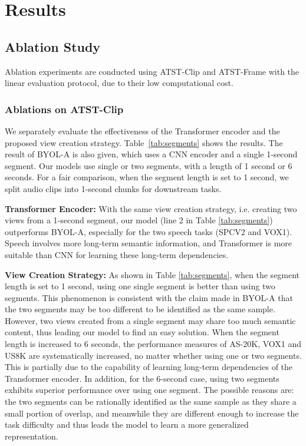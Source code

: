 
\section{Results}
\subsection{Ablation Study}
Ablation experiments are conducted using ATST-Clip  and ATST-Frame with the linear evaluation protocol, due to their low computational cost.

\subsubsection{Ablations on ATST-Clip}
\label{sec:ablation}


We separately evaluate the effectiveness of the Transformer encoder and the proposed view creation strategy. Table~\ref{tab:segments} shows the results. The result of BYOL-A is also given, which uses a CNN encoder and a single 1-second segment. Our models use single or two segments, with a length of 1 second or 6 seconds. For a fair comparison, when the segment length is set to 1 second, we split audio clips into 1-second chunks for downstream tasks.

\textbf{Transformer Encoder:} With the same view creation strategy, i.e. creating two views from a 1-second segment, our model (line 2 in Table \ref{tab:segments}) outperforms BYOL-A, especially for the two speech tasks (SPCV2 and VOX1). Speech involves more long-term semantic information, and Transformer is more suitable than CNN for learning these long-term dependencies. 

\textbf{View Creation Strategy:} As shown in Table \ref{tab:segments}, when the segment length is set to 1 second, using one single segment is better than using two segments. This phenomenon is consistent with the claim made in BYOL-A \cite{niizumi_byol_2021} that the two segments may be too different to be identified as the same sample. However, two views created from a single segment may share too much semantic content, thus leading our model to find an easy solution.
When the segment length is increased to 6 seconds, the performance measures of AS-20K, VOX1 and US8K are systematically increased, no matter whether using one or two segments. This is partially due to the capability of learning long-term dependencies of the Transformer encoder.
In addition, for the 6-second case, using two segments exhibits superior performance over using one segment. The possible reasons are: the two segments can be rationally identified as the same sample as they share a small portion of overlap, and meanwhile they are different enough to increase the task difficulty and thus leads the model to learn a more generalized representation.

